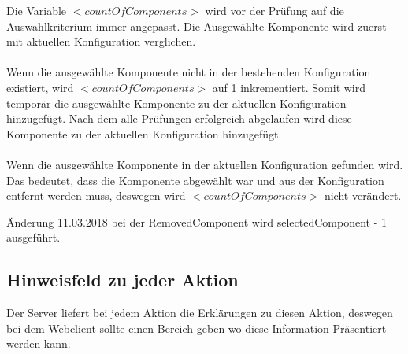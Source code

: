 \documentclass{article}
\begin{document}
\noindent Die Variable $<countOfComponents>$ wird vor der Prüfung auf die
Auswahlkriterium immer angepasst. Die Ausgewählte Komponente wird zuerst mit aktuellen
Konfiguration verglichen. \\\\
Wenn die ausgewählte Komponente nicht in der
bestehenden Konfiguration existiert, wird $<countOfComponents>$ auf 1
inkrementiert. Somit wird temporär die ausgewählte Komponente zu der
aktuellen Konfiguration hinzugefügt. Nach dem alle Prüfungen erfolgreich abgelaufen wird
diese Komponente zu der aktuellen Konfiguration hinzugefügt.\\\\
Wenn die ausgewählte Komponente in der aktuellen Konfiguration gefunden wird.
Das bedeutet, dass die Komponente abgewählt war und aus der Konfiguration
entfernt werden muss, deswegen wird $<countOfComponents>$ nicht verändert.

Änderung 11.03.2018 bei der RemovedComponent wird selectedComponent - 1
ausgeführt.

\subsection{Hinweisfeld zu jeder Aktion}
Der Server liefert bei jedem Aktion die Erklärungen zu diesen Aktion, deswegen
bei dem Webclient sollte einen Bereich geben wo diese Information Präsentiert
werden kann.


\end{document}
